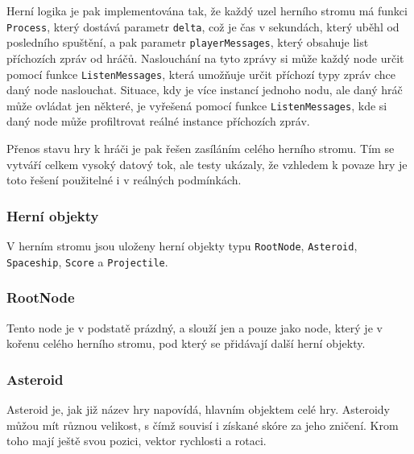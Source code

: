 \documentclass[12pt, a4paper]{article}
\begin{document}
    Herní logika je pak implementována tak, že každý uzel herního stromu má funkci \texttt{Process}, který dostává parametr \texttt{delta}, což je čas v sekundách, který uběhl od posledního spuštění, a pak parametr \texttt{playerMessages}, který obsahuje list příchozích zpráv od hráčů.
    Naslouchání na tyto zprávy si může každý node určit pomocí funkce \texttt{ListenMessages}, která umožňuje určit příchozí typy zpráv chce daný node naslouchat.
    Situace, kdy je více instancí jednoho nodu, ale daný hráč může ovládat jen některé, je vyřešená pomocí funkce \texttt{ListenMessages}, kde si daný node může profiltrovat reálné instance příchozích zpráv.

    Přenos stavu hry k hráči je pak řešen zasíláním celého herního stromu.
    Tím se vytváří celkem vysoký datový tok, ale testy ukázaly, že vzhledem k povaze hry je toto řešení použitelné i v reálných podmínkách.

    \subsubsection{Herní objekty}
    V herním stromu jsou uloženy herní objekty typu \texttt{RootNode}, \texttt{Asteroid}, \texttt{Spaceship}, \texttt{Score} a \texttt{Projectile}.

    \subsubsection*{RootNode}
    Tento node je v podstatě prázdný, a slouží jen a pouze jako node, který je v kořenu celého herního stromu, pod který se přidávají další herní objekty.

    \subsubsection*{Asteroid}
    Asteroid je, jak již název hry napovídá, hlavním objektem celé hry.
    Asteroidy můžou mít různou velikost, s čímž souvisí i získané skóre za jeho zničení.
    Krom toho mají ještě svou pozici, vektor rychlosti a rotaci.
\end{document}
